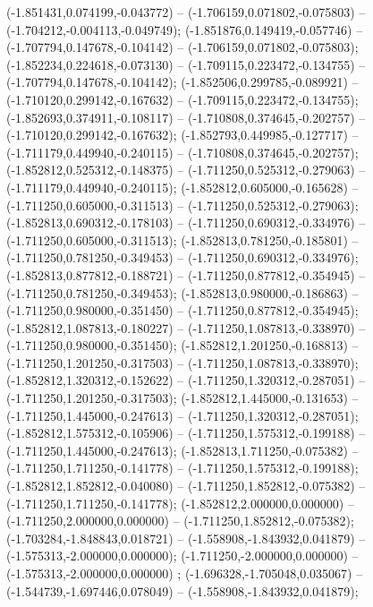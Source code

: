  (-1.851431,0.074199,-0.043772) -- (-1.706159,0.071802,-0.075803) -- (-1.704212,-0.004113,-0.049749);
 (-1.851876,0.149419,-0.057746) -- (-1.707794,0.147678,-0.104142) -- (-1.706159,0.071802,-0.075803);
 (-1.852234,0.224618,-0.073130) -- (-1.709115,0.223472,-0.134755) -- (-1.707794,0.147678,-0.104142);
 (-1.852506,0.299785,-0.089921) -- (-1.710120,0.299142,-0.167632) -- (-1.709115,0.223472,-0.134755);
 (-1.852693,0.374911,-0.108117) -- (-1.710808,0.374645,-0.202757) -- (-1.710120,0.299142,-0.167632);
 (-1.852793,0.449985,-0.127717) -- (-1.711179,0.449940,-0.240115) -- (-1.710808,0.374645,-0.202757);
 (-1.852812,0.525312,-0.148375) -- (-1.711250,0.525312,-0.279063) -- (-1.711179,0.449940,-0.240115);
 (-1.852812,0.605000,-0.165628) -- (-1.711250,0.605000,-0.311513) -- (-1.711250,0.525312,-0.279063);
 (-1.852813,0.690312,-0.178103) -- (-1.711250,0.690312,-0.334976) -- (-1.711250,0.605000,-0.311513);
 (-1.852813,0.781250,-0.185801) -- (-1.711250,0.781250,-0.349453) -- (-1.711250,0.690312,-0.334976);
 (-1.852813,0.877812,-0.188721) -- (-1.711250,0.877812,-0.354945) -- (-1.711250,0.781250,-0.349453);
 (-1.852813,0.980000,-0.186863) -- (-1.711250,0.980000,-0.351450) -- (-1.711250,0.877812,-0.354945);
 (-1.852812,1.087813,-0.180227) -- (-1.711250,1.087813,-0.338970) -- (-1.711250,0.980000,-0.351450);
 (-1.852812,1.201250,-0.168813) -- (-1.711250,1.201250,-0.317503) -- (-1.711250,1.087813,-0.338970);
 (-1.852812,1.320312,-0.152622) -- (-1.711250,1.320312,-0.287051) -- (-1.711250,1.201250,-0.317503);
 (-1.852812,1.445000,-0.131653) -- (-1.711250,1.445000,-0.247613) -- (-1.711250,1.320312,-0.287051);
 (-1.852812,1.575312,-0.105906) -- (-1.711250,1.575312,-0.199188) -- (-1.711250,1.445000,-0.247613);
 (-1.852813,1.711250,-0.075382) -- (-1.711250,1.711250,-0.141778) -- (-1.711250,1.575312,-0.199188);
 (-1.852812,1.852812,-0.040080) -- (-1.711250,1.852812,-0.075382) -- (-1.711250,1.711250,-0.141778);
 (-1.852812,2.000000,0.000000) -- (-1.711250,2.000000,0.000000) -- (-1.711250,1.852812,-0.075382);
 (-1.703284,-1.848843,0.018721) -- (-1.558908,-1.843932,0.041879) -- (-1.575313,-2.000000,0.000000);
 (-1.711250,-2.000000,0.000000) -- (-1.575313,-2.000000,0.000000) ;
 (-1.696328,-1.705048,0.035067) -- (-1.544739,-1.697446,0.078049) -- (-1.558908,-1.843932,0.041879);
